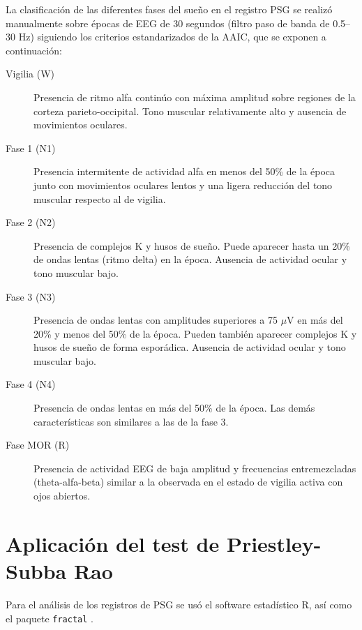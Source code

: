 \documentclass[12pt,a4paper]{mitthesis}
\begin{document}
La clasificaci\'on de las diferentes fases del sue\~no en el registro PSG se realiz\'o manualmente 
sobre \'epocas de EEG de 30 segundos (filtro paso de banda de 0.5--30 Hz) siguiendo los criterios 
estandarizados de la AAIC\cite{Hori01}, que se exponen a continuación:
\begin{description}
\item[Vigilia (W)] Presencia de ritmo alfa contin\'uo con m\'axima amplitud sobre regiones de la 
corteza parieto-occipital. Tono muscular relativamente alto y ausencia de movimientos oculares.

\item[Fase 1 (N1)] Presencia intermitente de actividad alfa en menos del 50\% de la \'epoca junto 
con movimientos oculares lentos y una ligera reducci\'on del tono muscular respecto al de vigilia.

\item[Fase 2 (N2)] Presencia de complejos K y husos de sue\~no. Puede aparecer hasta un 20\% de 
ondas lentas (ritmo delta) en la \'epoca. Ausencia de actividad ocular y tono muscular bajo.

\item[Fase 3 (N3)] Presencia de ondas lentas con amplitudes superiores a 75 $\mu$V en m\'as del 
20\% y menos del 50\% de la \'epoca. Pueden tambi\'en aparecer complejos K y husos de sue\~no de 
forma espor\'adica. Ausencia de actividad ocular y tono muscular bajo.

\item[Fase 4 (N4)] Presencia de ondas lentas en m\'as del 50\% de la época. Las dem\'as 
caracter\'isticas son similares a las de la fase 3.

\item[Fase MOR (R)] Presencia de actividad EEG de baja amplitud y frecuencias entremezcladas 
(theta-alfa-beta) similar a la observada en el estado de vigilia activa con ojos abiertos.
\end{description}


\section{Aplicaci\'on del test de Priestley-Subba Rao}

Para el an\'alisis de los registros de PSG se us\'o el software estad\'istico R\cite{R_citar}, 
as\'i como el paquete \texttt{fractal} \cite{R_fractal}.
\end{document}
